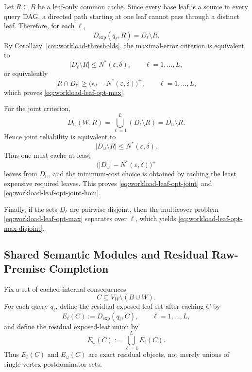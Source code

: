 \documentclass[journal]{IEEEtran}
\makeatletter
\numberwithin{equation}{section}
\renewenvironment{proof}[1][\proofname]{\par
  \pushQED{\qed}%
  \normalfont \topsep6\p@\@plus6\p@\relax
  \trivlist
  \item[\hskip\labelsep
        \itshape
    #1\@addpunct{.}]\ignorespaces
}{%
  \popQED\endtrivlist\@endpefalse
}
\makeatother
\begin{document}
\begin{proof}
Let \(R\subseteq B\) be a leaf-only common cache.  Since every base leaf is a
source in every query DAG, a directed path starting at one leaf cannot pass
through a distinct leaf.  Therefore, for each \(\ell\),
\[
  D_{\mathrm{exp}}(q_\ell,R)=D_\ell\setminus R.
\]
By Corollary~\ref{cor:workload-thresholds}, the maximal-error criterion is
equivalent to
\[
  |D_\ell\setminus R|
  \le
  N^*(\varepsilon,\delta),
  \qquad \ell=1,\ldots,L,
\]
or equivalently
\[
  |R\cap D_\ell|
  \ge
  \bigl(\kappa_\ell-N^*(\varepsilon,\delta)\bigr)^+,
  \qquad \ell=1,\ldots,L,
\]
which proves \eqref{eq:workload-leaf-opt-max}.

For the joint criterion,
\[
  D_{\cup}(W,R)
  =
  \bigcup_{\ell=1}^{L}(D_\ell\setminus R)
  =
  D_{\cup}\setminus R.
\]
Hence joint reliability is equivalent to
\[
  |D_{\cup}\setminus R|
  \le
  N^*(\varepsilon,\delta).
\]
Thus one must cache at least
\[
  \bigl(|D_{\cup}|-N^*(\varepsilon,\delta)\bigr)^+
\]
leaves from \(D_{\cup}\), and the minimum-cost choice is obtained by caching
the least expensive required leaves.  This proves
\eqref{eq:workload-leaf-opt-joint} and
\eqref{eq:workload-leaf-opt-joint-hom}.

Finally, if the sets \(D_\ell\) are pairwise disjoint, then the multicover
problem \eqref{eq:workload-leaf-opt-max} separates over \(\ell\), which yields
\eqref{eq:workload-leaf-opt-max-disjoint}.
\end{proof}

\subsection{Shared Semantic Modules and Residual Raw-Premise Completion}
\label{subsec:workload-shared-modules}

Fix a set of cached internal consequences
\[
  C\subseteq V_W\setminus(B\cup W).
\]
For each query \(q_\ell\), define the residual exposed-leaf set after caching
\(C\) by
\begin{equation}
  E_\ell(C):=D_{\mathrm{exp}}(q_\ell,C),
  \qquad \ell=1,\ldots,L,
\label{eq:def-workload-residual-family}
\end{equation}
and define the residual exposed-leaf union by
\begin{equation}
  E_{\cup}(C)
  :=
  \bigcup_{\ell=1}^{L}E_\ell(C).
\label{eq:def-workload-residual-union}
\end{equation}
Thus \(E_\ell(C)\) and \(E_{\cup}(C)\) are exact residual objects, not merely
unions of single-vertex postdominator sets.
\end{document}
